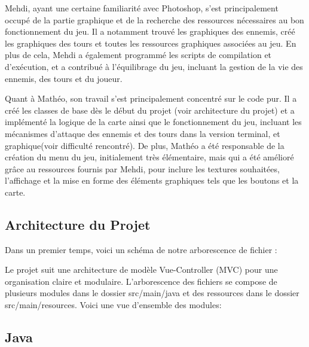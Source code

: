 \documentclass{article}
\begin{document}
Mehdi, ayant une certaine familiarité avec Photoshop, s'est principalement occupé de la partie graphique et de la recherche des ressources nécessaires au bon fonctionnement du jeu. Il a notamment trouvé les graphiques des ennemis, créé les graphiques des tours et toutes les ressources graphiques associées au jeu. En plus de cela, Mehdi a également programmé les scripts de compilation et d'exécution, et a contribué à l'équilibrage du jeu, incluant la gestion de la vie des ennemis, des tours et du joueur.

Quant à Mathéo, son travail s'est principalement concentré sur le code pur. Il a créé les classes de base dès le début du projet (voir architecture du projet) et a implémenté la logique de la carte ainsi que le fonctionnement du jeu, incluant les mécanismes d'attaque des ennemis et des tours dans la version terminal, et graphique(voir difficulté rencontré). De plus, Mathéo a été responsable de la création du menu du jeu, initialement très élémentaire, mais qui a été amélioré grâce au ressources fournis par Mehdi, pour inclure les textures souhaitées, l'affichage et la mise en forme des éléments graphiques tels que les boutons et la carte.


\subsection{Architecture du Projet}
Dans un premier temps, voici un schéma de notre arborescence de fichier : 

Le projet suit une architecture de modèle Vue-Controller (MVC) pour une organisation claire et modulaire. L'arborescence des fichiers se compose de plusieurs modules dans le dossier src/main/java et des ressources dans le dossier src/main/resources. Voici une vue d'ensemble des modules:

\subsection*{Java}
\end{document}
